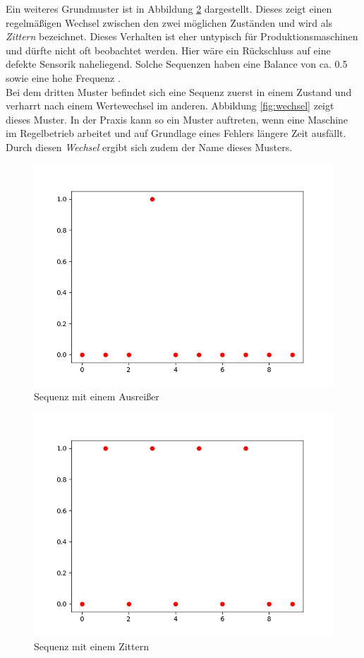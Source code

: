 Ein weiteres Grundmuster ist in Abbildung \ref{fig:zittern} dargestellt. Dieses zeigt einen regelmäßigen Wechsel zwischen den zwei möglichen Zuständen und wird als \textit{Zittern} bezeichnet. Dieses Verhalten ist eher untypisch für Produktionsmaschinen und dürfte nicht oft beobachtet werden. Hier wäre ein Rückschluss auf eine defekte Sensorik naheliegend. Solche Sequenzen haben eine Balance von ca. 0.5 sowie eine hohe Frequenz .\\ 

Bei dem dritten Muster befindet sich eine Sequenz zuerst in einem Zustand und verharrt nach einem Wertewechsel im anderen. Abbildung \ref{fig:wechsel} zeigt dieses Muster. In der Praxis kann so ein Muster auftreten, wenn eine Maschine im Regelbetrieb arbeitet und auf Grundlage eines Fehlers längere Zeit ausfällt. Durch diesen \textit{Wechsel} ergibt sich zudem der Name dieses Musters.

\begin{figure}
	\centering
		\includegraphics[scale=0.5]{images/Klassifizierung/ausreisser}
	\caption{Sequenz mit einem Ausreißer}
	\label{fig:ausreisser}
\end{figure}

\begin{figure}
	\centering
		\includegraphics[scale=0.5]{images/Klassifizierung/zittern}
	\caption{Sequenz mit einem Zittern}
	\label{fig:zittern}
\end{figure}

